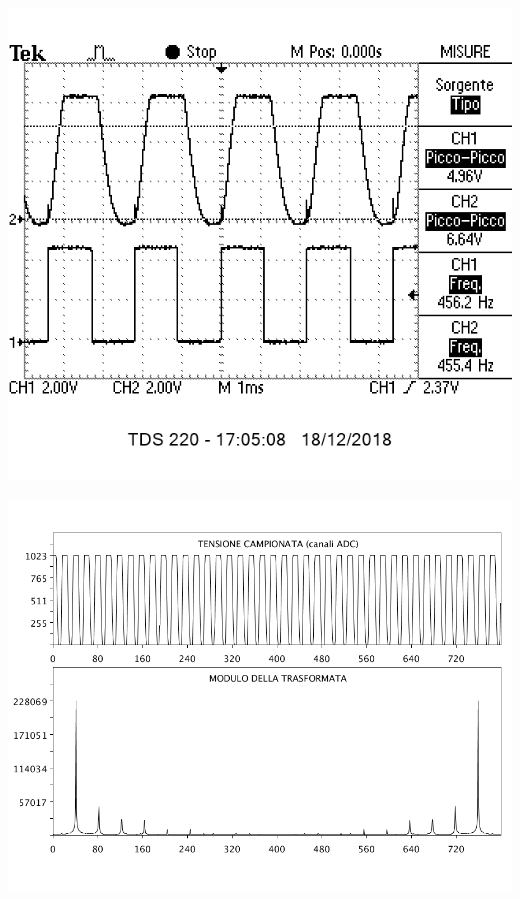 \documentclass[10pt,oneside,a4paper]{article}
\newenvironment{Figure}
  {\par\medskip\noindent\minipage{\linewidth}}
  {\endminipage\par\medskip}
\begin{document}
\begin{multicols}{2}
\begin{Figure}
	\begin{center}
	\includegraphics[width=0.8\linewidth]{quadraFiltroOsc}
	\label{fig:quadraFiltroOsc}
	\end{center}
\end{Figure}

\begin{Figure}
	\begin{center}
	\includegraphics[width=\linewidth]{quadraFiltro}
	\label{fig:quadraFiltro}
	\end{center}
\end{Figure}


\end{multicols}
\end{document}
